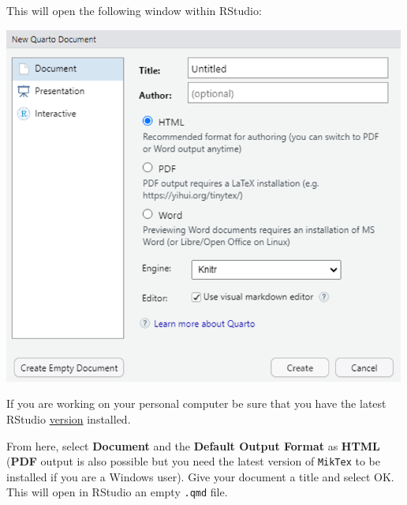 \documentclass[
  letterpaper,
  DIV=11,
  numbers=noendperiod]{scrartcl}
\begin{document}
This will open the following window within RStudio:

\begin{center}
\includegraphics[width=5.20833in,height=\textheight]{images/quarto1.png}
\end{center}

\begin{tcolorbox}[enhanced jigsaw, colback=white, bottomtitle=1mm, coltitle=black, titlerule=0mm, toprule=.15mm, rightrule=.15mm, colframe=quarto-callout-important-color-frame, bottomrule=.15mm, leftrule=.75mm, colbacktitle=quarto-callout-important-color!10!white, toptitle=1mm, title=\textcolor{quarto-callout-important-color}{\faExclamation}\hspace{0.5em}{Important}, arc=.35mm, breakable, opacitybacktitle=0.6, left=2mm, opacityback=0]

If you are working on your personal computer be sure that you have the
latest RStudio
\href{https://posit.co/download/rstudio-desktop/}{version} installed.

\end{tcolorbox}

From here, select \textbf{Document} and the \textbf{Default Output
Format} as \textbf{HTML} (\textbf{PDF} output is also possible but you
need the latest version of \texttt{MikTex} to be installed if you are a
Windows user). Give your document a title and select OK. This will open
in RStudio an empty \texttt{.qmd} file.
\end{document}
